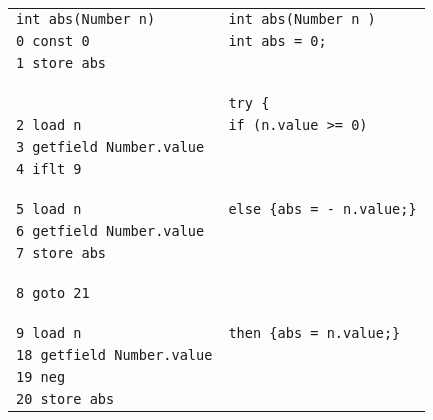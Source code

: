   \begin{figure}[ht!]
\begin{frameit}
  \scriptsize{
  \begin{tabular}{ll}
\lstinline!int abs(Number n)!    & \lstinline!int abs(Number n )! \\
				     
\lstinline!0 const 0!                 &  \lstinline!int abs = 0;!\\
\lstinline!1 store abs!		      & \\ 
				      & \\ &\\ &\\
				      & \lstinline!try {!\\
\lstinline!2 load n!                  & \Myspace \lstinline!if (n.value >= 0)!\\
\lstinline!3 getfield Number.value! & \\
\lstinline!4 iflt 9!                  & \\
                                      & \\ &\\ &\\
\lstinline!5 load n!                  & \Myspace\Myspace\lstinline!else {abs = - n.value;}!\\			
\lstinline!6 getfield Number.value! & \\
\lstinline!7 store abs!                 & \\
                                      & \\ &\\ &\\
\lstinline!8 goto 21!		      & \\
                                      & \\ &\\ &\\
\lstinline!9 load n!		      & \Myspace\Myspace\lstinline!then {abs = n.value;}!\\
\lstinline!18 getfield Number.value!&   \\
\lstinline!19 neg!                    & \\
\lstinline!20 store abs!	      & \\


\end{tabular}}
\end{frameit}
\end{figure}
